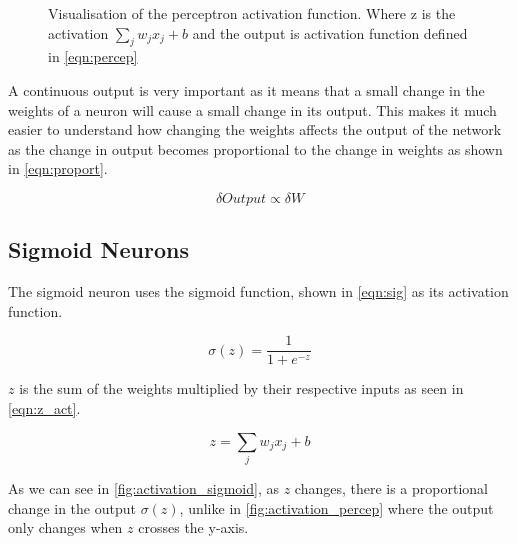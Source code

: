 \begin{figure}
\begin{center}
\caption{Visualisation of the perceptron activation function. Where z is the activation $\sum_{j} w_j x_j + b$ and the output is activation function defined in \autoref{eqn:percep} }
\label{fig:activation_percep}
\end{center}
\end{figure}

A continuous output is very important as it means that a small change in the weights of a neuron will cause a small change in its output. This makes it much easier to understand how changing the weights affects the output of the network as the change in output becomes proportional to the change in weights as shown in \autoref{eqn:proport}.

\begin{equation} \label{eqn:proport}
	\delta Output \propto \delta W	
\end{equation}  


\subsection{Sigmoid Neurons}

The sigmoid neuron uses the sigmoid function, shown in \autoref{eqn:sig} as its activation function. 

\begin{equation} \label{eqn:sig}
\sigma(z) = \frac{1}{1 + e^{-z}}
\end{equation}

$z$ is the sum of the weights multiplied by their respective inputs as seen in  \autoref{eqn:z_act}.

\begin{equation} \label{eqn:z_act}
z = \sum_{j} w_j x_j + b
\end{equation}

As we can see in \autoref{fig:activation_sigmoid}, as $z$ changes, there is a proportional change in the output $\sigma(z)$, unlike in \autoref{fig:activation_percep} where the output only changes when $z$ crosses the y-axis.

